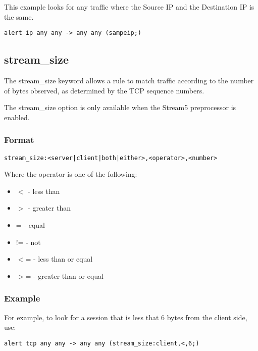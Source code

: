 \documentclass[english]{report}
\newenvironment{note}{
\samepage
    \vspace{10pt}{\textsf{
        {\hspace{7pt}\Huge{$\triangle$\hspace{-12.5pt}{\Large{$^!$}}}}\hspace{5pt}
        {\Large{NOTE}}
    }
    }
   \begin{center}
    \par\vspace{-17pt}

    \begin{lrbox}{\savepar}
    \begin{minipage}[r]{6in}
}
{
    \end{minipage}
    \end{lrbox}
    \fbox{
        \usebox{
            \savepar
	}
    }
    \par\vskip10pt
    \end{center}
}
\newenvironment{note}{
        \begin{rawhtml}
        <p><table border="1"><tr><td><b>
        Note:&nbsp;&nbsp;</b>
        \end{rawhtml}
}{
        \begin{rawhtml}
        </b></td></tr></table></p>
        \end{rawhtml}
}
\begin{document}
This example looks for any traffic where the Source IP and the Destination IP is the same.

\begin{verbatim}
alert ip any any -> any any (sampeip;)
\end{verbatim}

\subsection{stream\_size}

The stream\_size keyword allows a rule to match traffic according to the number
of bytes observed, as determined by the TCP sequence numbers.  

\begin{note}
The stream\_size option is only available when the Stream5 preprocessor is enabled.
\end{note}

\subsubsection{Format}

\begin{verbatim}
stream_size:<server|client|both|either>,<operator>,<number>
\end{verbatim}

Where the operator is one of the following:

\begin{itemize}
\item $<$ - less than
\item $>$ - greater than
\item = - equal
\item != - not
\item $<$= - less than or equal
\item $>$= - greater than or equal
\end{itemize}

\subsubsection{Example}

For example, to look for a session that is less that 6 bytes from the client side, use:

\begin{verbatim}
alert tcp any any -> any any (stream_size:client,<,6;)
\end{verbatim}
\end{document}
